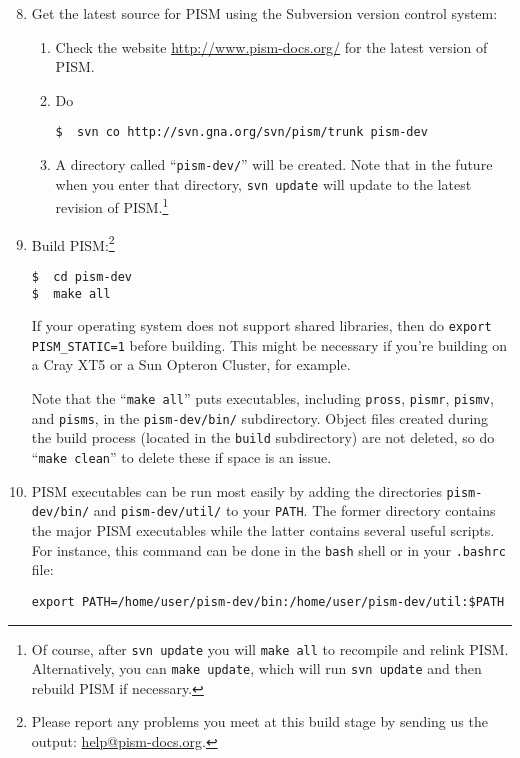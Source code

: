 \documentclass[11pt,final]{amsart}
\renewcommand{\t}[1]{\texttt{#1}}
\begin{document}
\begin{enumerate}\setcounter{enumi}{7}
\item Get the latest source for PISM using the Subversion version control system:
\begin{enumerate}
\item \label{getPISMstep} Check the website \url{http://www.pism-docs.org/} for the latest version of PISM.
\item Do
\begin{verbatim}
$  svn co http://svn.gna.org/svn/pism/trunk pism-dev
\end{verbatim}
\item A directory called ``\verb|pism-dev/|'' will be created.  Note that in the future when you enter that directory, \verb|svn update| will update to the latest revision of PISM.\footnote{Of course, after \t{svn update} you will \t{make all} to recompile and relink PISM. Alternatively, you can \t{make update}, which will run \t{svn update} and then rebuild PISM if necessary.}
\end{enumerate}

\item Build PISM:\footnote{Please report any problems you meet at this build stage by sending us the output: \href{mailto:help@pism-docs.org}{help@pism-docs.org}.}
\begin{verbatim}
$  cd pism-dev
$  make all
\end{verbatim}

If your operating system does not support shared libraries, then do \verb|export PISM_STATIC=1| before building.  This might be necessary if you're building on a Cray XT5 or a Sun Opteron Cluster, for example.

Note that the ``\verb|make all|'' puts executables, including \verb|pross|, \verb|pismr|, \verb|pismv|, and \verb|pisms|, in the \verb|pism-dev/bin/| subdirectory.  Object files created during the build process (located in the \verb|build| subdirectory) are not deleted, so do ``\verb|make clean|'' to delete these if space is an issue.

\item PISM executables can be run most easily by adding the directories \verb|pism-dev/bin/| and \verb|pism-dev/util/| to your \verb|PATH|.  The former directory contains the major PISM executables while the latter contains several useful scripts.  For instance, this command can be done in the \verb|bash| shell or in your \verb|.bashrc| file:
\begin{verbatim}
export PATH=/home/user/pism-dev/bin:/home/user/pism-dev/util:$PATH
\end{verbatim}
\end{enumerate}
\end{document}
